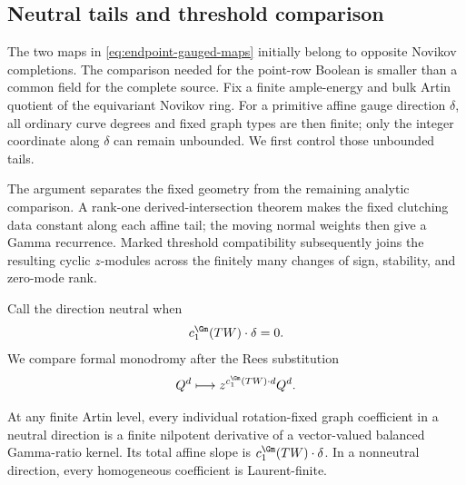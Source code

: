 \subsection{Neutral tails and threshold comparison}

The two maps in \eqref{eq:endpoint-gauged-maps} initially belong to opposite
Novikov completions.  The
comparison needed for the point-row Boolean is smaller than a common field
for the complete source.  Fix a finite ample-energy and bulk Artin quotient
of the equivariant Novikov ring.  For a primitive affine gauge direction
\(\delta\), all ordinary curve degrees and fixed graph types are then finite;
only the integer coordinate along \(\delta\) can remain unbounded.  We first
control those unbounded tails.

The argument separates the fixed geometry from the remaining analytic
comparison.  A rank-one derived-intersection theorem makes the fixed clutching
data constant along each affine tail; the moving normal weights then give a
Gamma recurrence.  Marked threshold compatibility subsequently joins the resulting
cyclic \(z\)-modules across the finitely many changes of sign, stability, and
zero-mode rank.

Call the direction neutral when
\begin{equation}\label{eq:neutral-direction}
 c_1^{\Gm}(TW)\cdot\delta=0.
\end{equation}
We compare formal monodromy after the Rees substitution
\begin{equation}\label{eq:rees-substitution}
 Q^d\longmapsto z^{c_1^{\Gm}(TW)\cdot d}Q^d.
\end{equation}

\begin{proposition}
\label{prop:gamma-ratio-reduction}
At any finite Artin level, every individual rotation-fixed graph coefficient
in a neutral direction is a finite nilpotent derivative of a vector-valued
balanced Gamma-ratio kernel.  Its total affine slope is
\(c_1^{\Gm}(TW)\cdot\delta\).  In a nonneutral direction, every homogeneous
coefficient is Laurent-finite.
\end{proposition}


